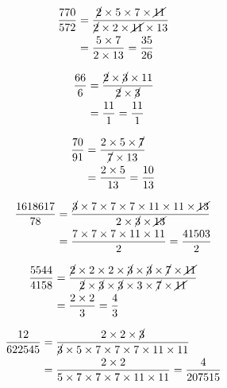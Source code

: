 {{\item\begin{align*}
    \frac{770}{572} &=
    \frac{\cancel{2} \times 5 \times 7 \times \cancel{11}}
    {\cancel{2} \times 2 \times \cancel{11} \times 13}\\ &=
    \frac{5 \times 7}
    {2 \times 13} =
    \frac{35}{26}
    \end{align*}

\item\begin{align*}
    \frac{66}{6} &=
    \frac{\cancel{2} \times \cancel{3} \times 11}
    {\cancel{2} \times \cancel{3}}\\ &=
    \frac{11}
    {1} =
    \frac{11}{1}
    \end{align*}

\item\begin{align*}
    \frac{70}{91} &=
    \frac{2 \times 5 \times \cancel{7}}
    {\cancel{7} \times 13}\\ &=
    \frac{2 \times 5}
    {13} =
    \frac{10}{13}
    \end{align*}

\item\begin{align*}
    \frac{1618617}{78} &=
    \frac{\cancel{3} \times 7 \times 7 \times 7 \times 11 \times 11 \times \cancel{13}}
    {2 \times \cancel{3} \times \cancel{13}}\\ &=
    \frac{7 \times 7 \times 7 \times 11 \times 11}
    {2} =
    \frac{41503}{2}
    \end{align*}

\item\begin{align*}
    \frac{5544}{4158} &=
    \frac{\cancel{2} \times 2 \times 2 \times \cancel{3} \times \cancel{3} \times \cancel{7} \times \cancel{11}}
    {\cancel{2} \times \cancel{3} \times \cancel{3} \times 3 \times \cancel{7} \times \cancel{11}}\\ &=
    \frac{2 \times 2}
    {3} =
    \frac{4}{3}
    \end{align*}

\item\begin{align*}
    \frac{12}{622545} &=
    \frac{2 \times 2 \times \cancel{3}}
    {\cancel{3} \times 5 \times 7 \times 7 \times 7 \times 11 \times 11}\\ &=
    \frac{2 \times 2}
    {5 \times 7 \times 7 \times 7 \times 11 \times 11} =
    \frac{4}{207515}
    \end{align*}

}}
